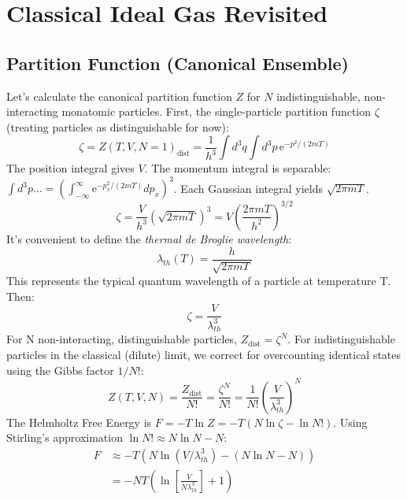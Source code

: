 \documentclass[10pt, letterpaper]{article}
\newcommand{\mathe}{\mathrm{e}} %
\begin{document}
\section{Classical Ideal Gas Revisited}

\subsection{Partition Function (Canonical Ensemble)}
Let's calculate the canonical partition function $Z$ for $N$ indistinguishable, non-interacting monatomic particles. First, the single-particle partition function $\zeta$ (treating particles as distinguishable for now):
\begin{equation*}
    \zeta = Z(T,V,N=1)_{\text{dist}} = \frac{1}{h^3} \int d^3q \int d^3p \, \mathe^{-p^2 / (2mT)}
\end{equation*}
The position integral gives $V$. The momentum integral is separable: $\int d^3p \dots = (\int_{-\infty}^\infty \mathe^{-p_x^2 / (2mT)} dp_x)^3$.
Each Gaussian integral yields $\sqrt{2 \pi m T}$.
\begin{equation*}
    \zeta = \frac{V}{h^3} ( \sqrt{2 \pi m T} )^3 = V \left( \frac{2 \pi m T}{h^2} \right)^{3/2}
\end{equation*}
It's convenient to define the \textit{thermal de Broglie wavelength}:
\begin{equation*}
    \lambda_{th}(T) = \frac{h}{\sqrt{2 \pi m T}}
\end{equation*}
This represents the typical quantum wavelength of a particle at temperature T. Then:
\begin{equation}
    \zeta = \frac{V}{\lambda_{th}^3}
\end{equation}
For N non-interacting, distinguishable particles, $Z_{\text{dist}} = \zeta^N$. For indistinguishable particles in the classical (dilute) limit, we correct for overcounting identical states using the Gibbs factor $1/N!$:
\begin{equation}
    Z(T,V,N) = \frac{Z_{\text{dist}}}{N!} = \frac{\zeta^N}{N!} = \frac{1}{N!} \left( \frac{V}{\lambda_{th}^3} \right)^N
\end{equation}
The Helmholtz Free Energy is $F = -T \ln Z = -T ( N \ln \zeta - \ln N! )$.
Using Stirling's approximation $\ln N! \approx N \ln N - N$:
\begin{align}
    F &\approx -T \left( N \ln(V/\lambda_{th}^3) - (N \ln N - N) \right) \\
      &= -N T \left( \ln \left[ \frac{V}{N \lambda_{th}^3} \right] + 1 \right) \label{eq:sackur_tetrode_F}
\end{align}
\end{document}
